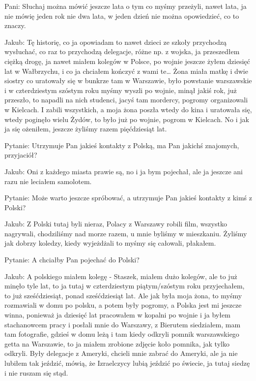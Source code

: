 Pani: Słuchaj można mówić jeszcze lata o tym co myśmy przeżyli, nawet lata, ja nie mówię jeden rok nie dwa lata, w jeden dzień nie można opowiedzieć, co to znaczy. 

Jakub: Tę historię, co ja opowiadam to nawet dzieci ze szkoły przychodzą wysłuchać, co raz to przychodzą delegacje, różne np. z wojska, ja przeszedłem ciężką drogę, ja nawet miałem kolegów w Polsce, po wojnie jeszcze żyłem dziesięć lat w Wałbrzychu, i co ja chciałem kończyć z wami te… Żona miała matkę i dwie siostry co uratowały się w bunkrze tam w Warszawie, było powstanie warszawskie i w czterdziestym szóstym roku myśmy wyszli po wojnie, minął jakiś rok, już przeszło, to napadli na nich studenci, jacyś tam mordercy, pogromy organizowali w Kielcach. I zabili wszystkich,    a moja żona poszła wtedy do kina i uratowała się, wtedy poginęło wielu Żydów, to było już po wojnie, pogrom w Kielcach. No i jak ja się ożeniłem, jeszcze żyliśmy razem pięćdziesiąt lat.  

Pytanie: Utrzymuje Pan jakieś kontakty z Polską, ma Pan jakichś znajomych, przyjaciół?  

Jakub: Oni z każdego miasta prawie są, no i ja bym pojechał, ale ja jeszcze ani razu nie leciałem samolotem. 

Pytanie: Może warto jeszcze spróbować, a utrzymuje Pan jakieś kontakty z kimś z Polski? 

 Jakub: Z Polski tutaj byli nieraz, Polacy z Warszawy robili film, wszystko nagrywali, chodziliśmy nad morze razem, u mnie byliśmy w mieszkaniu. Żyliśmy jak dobrzy koledzy, kiedy wyjeżdżali to myśmy się całowali, płakałem. 

Pytanie: A chciałby Pan pojechać do Polski? 

 Jakub: A polskiego miałem kolegę - Staszek, miałem dużo kolegów, ale to już minęło tyle lat, to ja tutaj w czterdziestym piątym/szóstym roku przyjechałem, to już sześćdziesiąt, ponad sześćdziesiąt lat. Ale jak była moja żona, to myśmy rozmawiali w domu po polsku, a potem były pogromy, a Polska jest mi jeszcze winna, ponieważ ja dziesięć lat pracowałem w kopalni po wojnie i ja byłem stachanowcem pracy i posłali mnie do Warszawy, z Bierutem siedziałem, mam tam fotografie, gdzieś w domu leżą i tam kiedy odkryli pomnik warszawskiego getta na Warszawie, to ja miałem zrobione zdjęcie koło pomnika, jak tylko odkryli. Były delegacje z Ameryki, chcieli mnie zabrać do Ameryki, ale ja nie lubiłem tak jeździć, mówią, że Izraelczycy lubią jeździć po świecie, ja tutaj siedzę i nie ruszam się stąd. 

